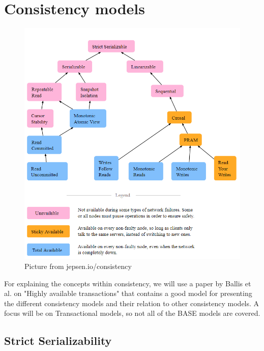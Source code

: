 \documentclass[a4paper,10pt,titlepage]{report}
\begin{document}
\newpage
\section{Consistency models}

\begin{figure}
    \centering
    \includegraphics[scale=0.4]{images/consistency models.PNG}
    \caption{Picture from jepsen.io/consistency}
    \label{fig:jepsenioconsistency}
\end{figure}
For explaining the concepts within consistency, we will use a paper by Ballis et al. on "Highly available transactions" \cite{HighlyAvailableTransactionsVirtuesandLimitations} that contains a good model for presenting the different consistency models and their relation to other consistency models. A focus will be on Transactional models, so not all of the BASE models are covered.\\

\subsection{Strict Serializability}
\end{document}
